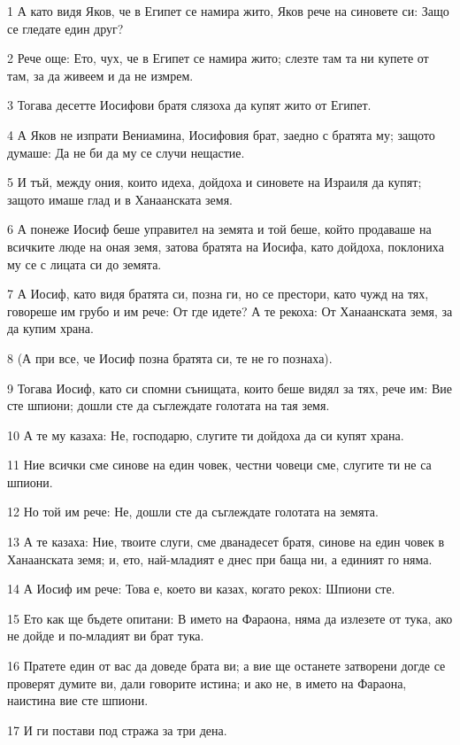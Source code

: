\par 1 А като видя Яков, че в Египет се намира жито, Яков рече на синовете си: Защо се гледате един друг?
\par 2 Рече още: Ето, чух, че в Египет се намира жито; слезте там та ни купете от там, за да живеем и да не измрем.
\par 3 Тогава десетте Иосифови братя слязоха да купят жито от Египет.
\par 4 А Яков не изпрати Вениамина, Иосифовия брат, заедно с братята му; защото думаше: Да не би да му се случи нещастие.
\par 5 И тъй, между ония, които идеха, дойдоха и синовете на Израиля да купят; защото имаше глад и в Ханаанската земя.
\par 6 А понеже Иосиф беше управител на земята и той беше, който продаваше на всичките люде на оная земя, затова братята на Иосифа, като дойдоха, поклониха му се с лицата си до земята.
\par 7 А Иосиф, като видя братята си, позна ги, но се престори, като чужд на тях, говореше им грубо и им рече: От где идете? А те рекоха: От Ханаанската земя, за да купим храна.
\par 8 (А при все, че Иосиф позна братята си, те не го познаха).
\par 9 Тогава Иосиф, като си спомни сънищата, които беше видял за тях, рече им: Вие сте шпиони; дошли сте да съглеждате голотата на тая земя.
\par 10 А те му казаха: Не, господарю, слугите ти дойдоха да си купят храна.
\par 11 Ние всички сме синове на един човек, честни човеци сме, слугите ти не са шпиони.
\par 12 Но той им рече: Не, дошли сте да съглеждате голотата на земята.
\par 13 А те казаха: Ние, твоите слуги, сме дванадесет братя, синове на един човек в Ханаанската земя; и, ето, най-младият е днес при баща ни, а единият го няма.
\par 14 А Иосиф им рече: Това е, което ви казах, когато рекох: Шпиони сте.
\par 15 Ето как ще бъдете опитани: В името на Фараона, няма да излезете от тука, ако не дойде и по-младият ви брат тука.
\par 16 Пратете един от вас да доведе брата ви; а вие ще останете затворени догде се проверят думите ви, дали говорите истина; и ако не, в името на Фараона, наистина вие сте шпиони.
\par 17 И ги постави под стража за три дена.
